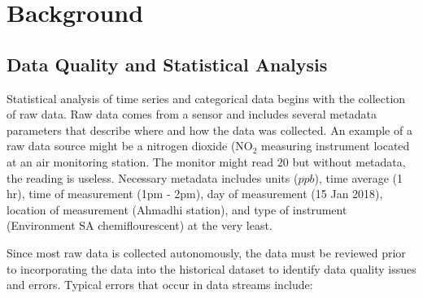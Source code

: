 \chapter{Background}

\section{Data Quality and Statistical Analysis}

Statistical analysis of time series and categorical data begins with the collection of raw data. Raw data comes from a sensor and includes several metadata parameters that describe where and how the data was collected. An example of a raw data source might be a nitrogen dioxide (NO$_{2}$ measuring instrument located at an air monitoring station. The monitor might read $20$ but without metadata, the reading is useless. Necessary metadata includes units ($ppb$), time average (1 hr), time of measurement (1pm - 2pm), day of measurement (15 Jan 2018), location of measurement (Ahmadhi station), and type of instrument (Environment SA chemiflourescent) at the very least.

Since most raw data is collected autonomously, the data must be reviewed prior to incorporating the data into the historical dataset to identify data quality issues and errors. Typical errors that occur in data streams include:

